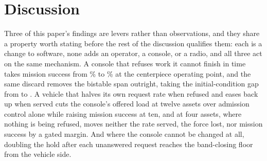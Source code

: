\documentclass[11pt]{article}
\begin{document}
\begin{table}[H]
\centering
\caption{Bayesian versus frequentist intervals for a design's mission-success probability, at the full sample and on the first \bteSmallN{} replications. The Wald interval runs above one on little data; the Beta credible interval stays inside [0,1] and yields a compliance probability $P(p\ge0.8)$.}
\label{tab:bayeste}

\end{table}

\section{Discussion}
\label{sec:discussion}

Three of this paper's findings are levers rather than observations, and they share a property worth stating before the rest of the discussion qualifies them: each is a change to software, none adds an operator, a console, or a radio, and all three act on the same mechanism. A console that refuses work it cannot finish in time takes mission success from \qBlindClear\% to \qAdmitClear\% at the centerpiece operating point, and the same discard removes the bistable span outright, taking the initial-condition gap from \qBandBlind{} to \qBandRefund{}. A vehicle that halves its own request rate when refused and eases back up when served cuts the console's offered load \rtAskedAimdOverAdmitClearTwelve{} at twelve assets over admission control alone while raising mission success \aiSuccClearGainTen{} at ten, and at four assets, where nothing is being refused, moves neither the rate served, the force lost, nor mission success by a gated margin. And where the console cannot be changed at all, doubling the hold after each unanswered request reaches the band-closing floor from the vehicle side.
\end{document}

